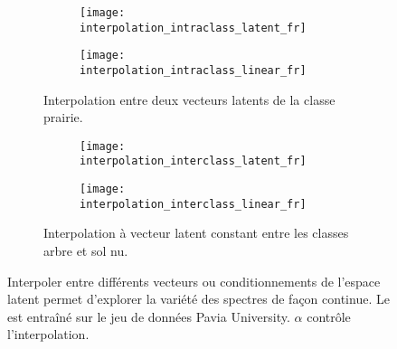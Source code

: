 \begin{figure}[ht]
\begin{subfigure}{\textwidth}
	\begin{subfigure}{0.5\textwidth}
		\texttt{[image: interpolation\_intraclass\_latent\_fr]}
	\end{subfigure}
	\begin{subfigure}{0.5\textwidth}
		\texttt{[image: interpolation\_intraclass\_linear\_fr]}
	\end{subfigure}
	\caption{Interpolation entre deux vecteurs latents de la classe prairie.}
	\label{fig:interpolation_intra}
\end{subfigure}

\begin{subfigure}{\textwidth}
	\begin{subfigure}{0.5\textwidth}
		\texttt{[image: interpolation\_interclass\_latent\_fr]}
	\end{subfigure}
	\begin{subfigure}{0.5\textwidth}
		\texttt{[image: interpolation\_interclass\_linear\_fr]}
	\end{subfigure}
	\caption{Interpolation à vecteur latent constant entre les classes arbre et sol nu.}
	\label{fig:interpolation_inter}
\end{subfigure}

\caption{Interpoler entre différents vecteurs ou conditionnements de l'espace latent permet d'explorer la variété des spectres de façon continue. Le  est entraîné sur le jeu de données Pavia University. $\alpha$ contrôle l'interpolation.}
\label{fig:interpolation}
\end{figure}

